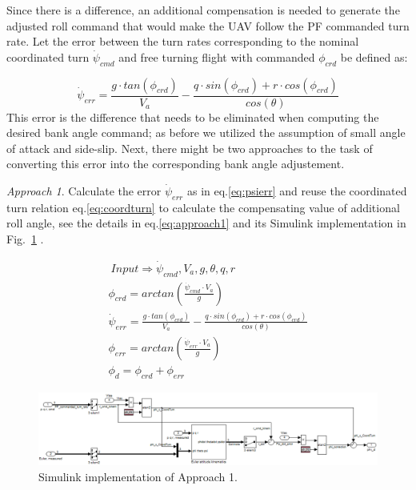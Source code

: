 \documentclass[]{article}
\begin{document}
Since there is a difference, an additional compensation is needed to generate the adjusted roll command that would make the UAV follow the PF commanded turn rate. Let the error between the turn rates corresponding to the nominal coordinated turn $\dot{\psi}_{cmd}$ and free turning flight with commanded $\phi_{crd}$ be defined as:

\begin{equation}
\label{eq:psierr}
	\dot{\psi}_{err}=\frac { g \cdot tan(\phi_{crd})} {V_a} - \frac {q \cdot sin(\phi_{crd})+ r \cdot cos(\phi_{crd})} {cos(\theta)}	
\end{equation}
This error is the difference that needs to be eliminated when computing the desired bank angle command; as before we utilized the assumption of small angle of attack and side-slip. Next, there might be two approaches to the task of converting this error into the corresponding bank angle adjustement. 

\emph{Approach 1}. Calculate the error $\dot{\psi}_{err}$ as in eq.\ref{eq:psierr} and reuse the coordinated turn relation eq.\ref{eq:coordturn} to calculate the compensating value of additional roll angle, see the details in eq.\ref{eq:approach1} and its Simulink implementation  in Fig.~\ref{fig:Approach1} .

\begin{eqnarray}
\label{eq:approach1}
	\ Input \Rightarrow \dot{\psi}_{cmd}, V_a, g, \theta, q, r  \nonumber \\
	\phi_{crd}=arctan( \frac { \dot{\psi}_{cmd} \cdot V_a} {g}) \nonumber  \\
	\dot{\psi}_{err}=\frac { g \cdot tan(\phi_{crd})} {V_a} - \frac {q \cdot sin(\phi_{crd})+ r \cdot cos(\phi_{crd})} {cos(\theta)} \nonumber \\
	\phi_{err}=arctan( \frac { \dot{\psi}_{err} \cdot V_a} {g}) \nonumber  \\	
	\phi_d=\phi_{crd}+\phi_{err}
\end{eqnarray}

\begin{figure}[thpb]
      \centering
      \includegraphics[width=128mm]{approach1.png}
      \caption{Simulink implementation of Approach 1.}
      \label{fig:Approach1}
   \end{figure}
\end{document}
